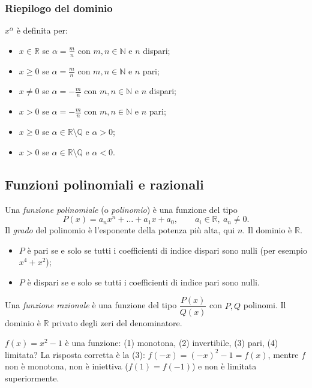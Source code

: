 \documentclass[11pt,a4paper]{article}
\begin{document}
\subsubsection*{Riepilogo del dominio}

$x^\alpha$ è definita per:
\begin{itemize}
    \item $x \in \mathbb{R}$ se $\alpha = \frac{m}{n}$ con $m, n \in \mathbb{N}$ e $n$ dispari;
    \item $x \ge 0$ se $\alpha = \frac{m}{n}$ con $m, n \in \mathbb{N}$ e $n$ pari;
    \item $x \ne 0$ se $\alpha = -\frac{m}{n}$ con $m, n \in \mathbb{N}$ e $n$ dispari;
    \item $x > 0$ se $\alpha = -\frac{m}{n}$ con $m, n \in \mathbb{N}$ e $n$ pari;
    \item $x \ge 0$ se $\alpha \in \mathbb{R} \setminus \mathbb{Q}$ e $\alpha > 0$;
    \item $x > 0$ se $\alpha \in \mathbb{R} \setminus \mathbb{Q}$ e $\alpha < 0$.
\end{itemize}

\subsection{Funzioni polinomiali e razionali}

Una \emph{funzione polinomiale} (o \emph{polinomio}) è una funzione del tipo
\[
P(x) = a_n x^n + \dots + a_1 x + a_0, \qquad a_i \in \mathbb{R},\ a_n \ne 0.
\]
Il \emph{grado} del polinomio è l'esponente della potenza più alta, qui $n$. Il dominio è $\mathbb{R}$.
\begin{itemize}
    \item $P$ è pari se e solo se tutti i coefficienti di indice dispari sono nulli (per esempio $x^4 + x^2$);
    \item $P$ è dispari se e solo se tutti i coefficienti di indice pari sono nulli.
\end{itemize}

Una \emph{funzione razionale} è una funzione del tipo $\dfrac{P(x)}{Q(x)}$ con $P, Q$ polinomi. Il dominio è $\mathbb{R}$ privato degli zeri del denominatore.

\begin{esempio}[Test]
$f(x) = x^2 - 1$ è una funzione: (1) monotona, (2) invertibile, (3) pari, (4) limitata? La risposta corretta è la (3): $f(-x) = (-x)^2 - 1 = f(x)$, mentre $f$ non è monotona, non è iniettiva ($f(1) = f(-1)$) e non è limitata superiormente.
\end{esempio}
\end{document}
